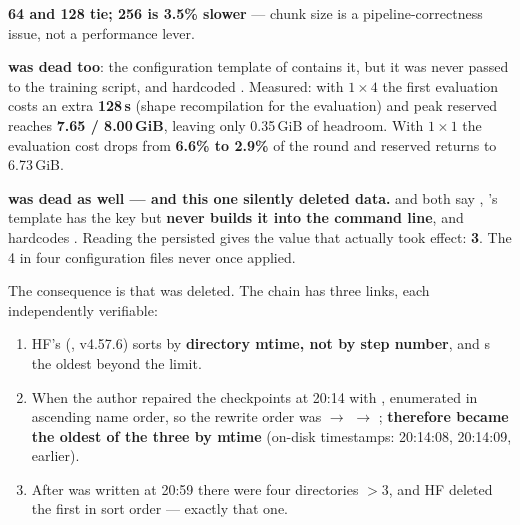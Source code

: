 \documentclass[11pt,openany]{article}
\begin{document}
\textbf{64 and 128 tie; 256 is 3.5\% slower} --- chunk size is a pipeline-correctness issue,
not a performance lever.

\textbf{ was dead too}: the configuration template of
 contains it, but it was never passed to the training script, and
 hardcoded . Measured: with $1\times4$ the first evaluation costs an
extra \textbf{128\,s} (shape recompilation for the evaluation) and peak reserved reaches
\textbf{7.65 / 8.00\,GiB}, leaving only 0.35\,GiB of headroom. With $1\times1$ the evaluation
cost drops from \textbf{6.6\% to 2.9\%} of the round and reserved returns to 6.73\,GiB.

\textbf{ was dead as well --- and this one silently deleted data.}
 and  both say
, 's template has the key but \textbf{never
builds it into the command line}, and  hardcodes .
Reading the persisted  gives the value that actually
took effect: \textbf{3}. The 4 in four configuration files never once applied.

The consequence is that  was deleted. The chain has three links, each
independently verifiable:

\begin{enumerate}
\item HF's 
      (, v4.57.6) sorts by \textbf{directory mtime, not by step
      number}, and s the oldest beyond the limit.
\item When the author repaired the checkpoints at 20:14 with
      ,  enumerated in ascending
      name order, so the rewrite order was  $\rightarrow$  $\rightarrow$
      ; \textbf{ therefore became the oldest of the three by
      mtime} (on-disk timestamps:  20:14:08, 
      20:14:09,  earlier).
\item After  was written at 20:59 there were four directories $>3$, and
      HF deleted the first in sort order --- exactly that one.
\end{enumerate}
\end{document}
